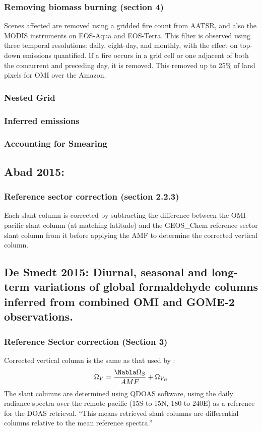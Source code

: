 \documentclass[11pt]{article} %
\begin{document}
    
    \subsubsection{Removing biomass burning (section 4)}
      Scenes affected are removed using a gridded fire count from AATSR, and also the MODIS instruments on EOS-Aqua and EOS-Terra.
      This filter is observed using three temporal resolutions: daily, eight-day, and monthly, with the effect on top-down emissions quantified.
      If a fire occurs in a grid cell or one adjacent of both the concurrent and preceding day, it is removed.
      This removed up to 25\% of land pixels for OMI over the Amazon.
    
    \subsubsection{Nested Grid}
    
    \subsubsection{Inferred emissions}
    
    \subsubsection{Accounting for Smearing}
      
  \subsection{Abad 2015: }
    \citet{Abad2015}
    \subsubsection{Reference sector correction (section 2.2.3)}
      Each slant column is corrected by subtracting the difference between the OMI pacific slant column (at matching latitude) and the GEOS_Chem reference sector slant column from it before applying the AMF to determine the corrected vertical column.
      
  
  \subsection{De Smedt 2015: Diurnal, seasonal and long-term variations of global formaldehyde columns inferred from combined OMI and GOME-2 observations.}
    \citet{DeSmedt2015}
    \subsubsection{Reference Sector correction (Section 3)}
      Corrected vertical column is the same as that used by \citet{Barkley2013}:
      \begin{equation*}
        \Omega_V = \frac{ \Nabla \Omega_{S} }{ AMF } + \Omega_{V_B}
      \end{equation*}
      The slant columns are determined using QDOAS software, using the daily radiance spectra over the remote pacific (15S to 15N, 180 to 240E) as a reference for the DOAS retrieval. 
      ``This means retrieved slant columns are differential columns relative to the mean reference spectra.''
      
\end{document}
